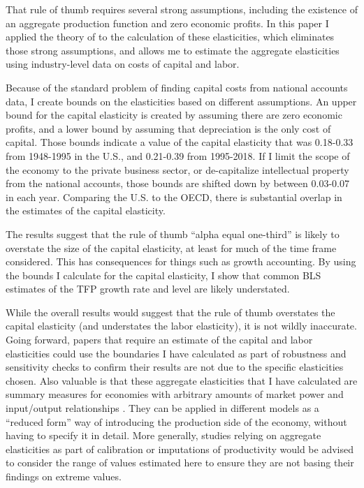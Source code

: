 \documentclass[11pt]{article}
\begin{document}
That rule of thumb requires several strong assumptions, including the existence of an aggregate production function and zero economic profits. In this paper I applied the theory of \cite{bfshortnote,bfprodge} to the calculation of these elasticities, which eliminates those strong assumptions, and allows me to estimate the aggregate elasticities using industry-level data on costs of capital and labor. 

Because of the standard problem of finding capital costs from national accounts data, I create bounds on the elasticities based on different assumptions. An upper bound for the capital elasticity is created by assuming there are zero economic profits, and a lower bound by assuming that depreciation is the only cost of capital. Those bounds indicate a value of the capital elasticity that was 0.18-0.33 from 1948-1995 in the U.S., and 0.21-0.39 from 1995-2018. If I limit the scope of the economy to the private business sector, or de-capitalize intellectual property from the national accounts, those bounds are shifted down by between 0.03-0.07 in each year. Comparing the U.S. to the OECD, there is substantial overlap in the estimates of the capital elasticity.

The results suggest that the rule of thumb ``alpha equal one-third'' is likely to overstate the size of the capital elasticity, at least for much of the time frame considered. This has consequences for things such as growth accounting. By using the bounds I calculate for the capital elasticity, I show that common BLS estimates of the TFP growth rate and level are likely understated.

While the overall results would suggest that the rule of thumb overstates the capital elasticity (and understates the labor elasticity), it is not wildly inaccurate. Going forward, papers that require an estimate of the capital and labor elasticities could use the boundaries I have calculated as part of robustness and sensitivity checks to confirm their results are not due to the specific elasticities chosen. Also valuable is that these aggregate elasticities that I have calculated are summary measures for economies with arbitrary amounts of market power and input/output relationships \citep{bfshortnote,bfprodge}. They can be applied in different models as a ``reduced form'' way of introducing the production side of the economy, without having to specify it in detail. More generally, studies relying on aggregate elasticities as part of calibration or imputations of productivity would be advised to consider the range of values estimated here to ensure they are not basing their findings on extreme values.
\end{document}
